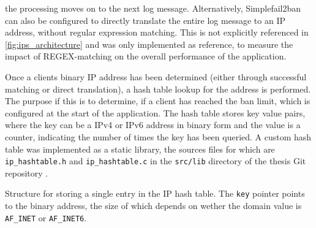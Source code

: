 the processing moves on to the next log message. Alternatively, Simplefail2ban can also be configured to directly translate the entire log message to an \ac{IP} address, without regular expression matching.
This is not explicitly referenced in \ref{fig:ips_architecture} and was only implemented as reference, to measure the impact of \ac{REGEX}-matching on the overall performance of the application.
\par
Once a clients binary \ac{IP} address has been determined (either through successful matching or direct translation), a hash table lookup for the address is performed.
The purpose if this is to determine, if a client has reached the ban limit, which is configured at the start of the application. 
The hash table stores key value pairs, where the key can be a \ac{IPv4} or \ac{IPv6} address in binary form and the value is a counter,
indicating the number of times the key has been queried. A custom hash table was implemented as a static library, the sources files for which are \texttt{ip\_hashtable.h}
and \texttt{ip\_hashtable.c} in the \texttt{src/lib} directory of the thesis Git repository \cite{gitlab}. 

\begin{algorithm}[h!]
    
    \label{alg:ip_hashtable}
    \caption[IP Hash Table]{Structure for storing a single entry in the IP hash table. The \texttt{key} pointer 
    points to the binary address, the size of which depends on wether the domain value is \texttt{AF\_INET} or \texttt{AF\_INET6}.}
\end{algorithm}

